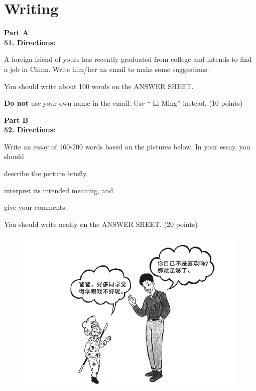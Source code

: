 \newpage

\section{Writing}



\noindent
\textbf{Part A}\\
\textbf{51. Directions:}


A foreign friend of yours has recently graduated from college and
intends to find a job in China. Write him/her an email to make some
suggestions.


You should write about 100 words on the ANSWER SHEET.



\textbf{Do not} use your own name in the email. Use `` Li Ming''
instead. (10 points)

\vspace{2em}

\noindent
\textbf{Part B}\\
\textbf{52. Directions:}



Write an essay of 160-200 words based on the pictures below. In
your essay, you should


\begin{listwrite}
	\item 
	describe the picture briefly,
	
	\item 
	interpret its intended meaning, and
	
	\item 
	give your comments.
\end{listwrite}

You should write neatly on the ANSWER SHEET. (20 points)


\begin{figure}[h!]
	\centering
	\includegraphics[width=0.64\linewidth]{picture/2021.png}
\end{figure}




\checkpagenumber